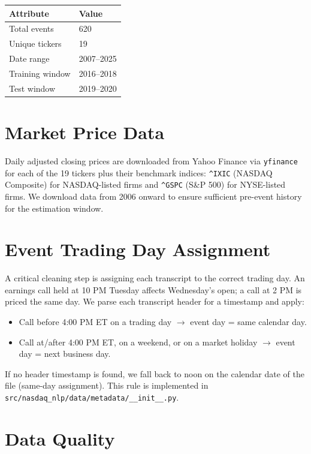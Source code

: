 \documentclass[12pt,a4paper]{article}
\begin{document}
\begin{center}
\begin{tabular}{ll}
\toprule
Attribute & Value \\
\midrule
Total events & 620 \\
Unique tickers & 19 \\
Date range & 2007--2025 \\
Training window & 2016--2018 \\
Test window & 2019--2020 \\
\bottomrule
\end{tabular}
\end{center}

\section{Market Price Data}

Daily adjusted closing prices are downloaded from Yahoo Finance via \texttt{yfinance}
for each of the 19 tickers plus their benchmark indices:
\texttt{\^{}IXIC} (NASDAQ Composite) for NASDAQ-listed firms and
\texttt{\^{}GSPC} (S\&P 500) for NYSE-listed firms.
We download data from 2006 onward to ensure sufficient pre-event history for the
estimation window.

\section{Event Trading Day Assignment}

A critical cleaning step is assigning each transcript to the correct trading day.
An earnings call held at 10 PM Tuesday affects Wednesday's open; a call at 2 PM
is priced the same day.  We parse each transcript header for a timestamp and apply:

\begin{itemize}
  \item Call before 4:00 PM ET on a trading day $\rightarrow$ event day = same calendar day.
  \item Call at/after 4:00 PM ET, on a weekend, or on a market holiday
        $\rightarrow$ event day = next business day.
\end{itemize}

If no header timestamp is found, we fall back to noon on the calendar date of the
file (same-day assignment).  This rule is implemented in
\texttt{src/nasdaq\_nlp/data/metadata/\_\_init\_\_.py}.

\section{Data Quality}
\end{document}
